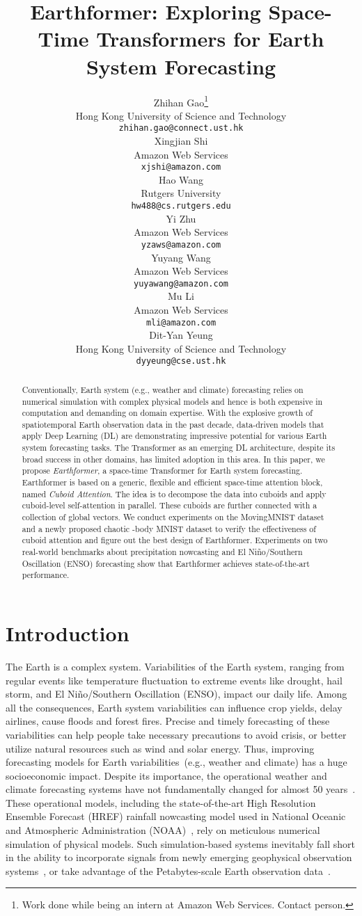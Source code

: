 \documentclass{article}
\title{Earthformer: Exploring Space-Time Transformers for Earth System Forecasting}
\author{Zhihan Gao\thanks{Work done while being an intern at Amazon Web Services. Contact person.} \\
  Hong Kong University of Science and Technology\\
\texttt{zhihan.gao@connect.ust.hk} \\
  \And
  Xingjian Shi\\
  Amazon Web Services \\
  \texttt{xjshi@amazon.com} \\
  \And
  Hao Wang \\
  Rutgers University\\
  \texttt{hw488@cs.rutgers.edu}\\
  \And
  Yi Zhu\\
  Amazon Web Services \\
  \texttt{yzaws@amazon.com} \\
  \And
  Yuyang Wang\\
  Amazon Web Services \\
  \texttt{yuyawang@amazon.com} \\
  \And
  Mu Li\\
  Amazon Web Services \\
  \texttt{mli@amazon.com} \\
  \And
  Dit-Yan Yeung\\
  Hong Kong University of Science and Technology \\
  \texttt{dyyeung@cse.ust.hk} \\
}
\def\nbody{-body MNIST}
\begin{document}
\maketitle


\begin{abstract}
Conventionally, Earth system (e.g., weather and climate) forecasting relies on numerical simulation with complex physical models and hence is both expensive in computation and demanding on domain expertise. 
With the explosive growth of spatiotemporal Earth observation data in the past decade, data-driven models that apply Deep Learning (DL) are demonstrating impressive potential for various Earth system forecasting tasks.
The Transformer as an emerging DL architecture, despite its broad success in other domains, has limited adoption in this area.
In this paper, we propose \emph{Earthformer}, a space-time Transformer for Earth system forecasting. Earthformer is based on a generic, flexible and efficient space-time attention block, named \emph{Cuboid Attention}. The idea is to decompose the data into cuboids and apply cuboid-level self-attention in parallel. These cuboids are further connected with a collection of global vectors. We conduct experiments on the MovingMNIST dataset and a newly proposed chaotic \nbody{} dataset to verify the effectiveness of cuboid attention and figure out the best design of Earthformer. Experiments on two real-world benchmarks about precipitation nowcasting and El Niño/Southern Oscillation (ENSO) forecasting show that Earthformer achieves state-of-the-art performance.
\end{abstract}

\section{Introduction}

The Earth is a complex system. Variabilities of the Earth system, ranging from regular events like temperature fluctuation to extreme events like drought, hail storm, and El Niño/Southern Oscillation (ENSO), impact our daily life. Among all the consequences, Earth system variabilities can influence crop yields, delay airlines, cause floods and forest fires. Precise and timely forecasting of these variabilities can help people take necessary precautions to avoid crisis, or better utilize natural resources such as wind and solar energy. Thus, improving forecasting models for Earth variabilities~(e.g., weather and climate) has a huge socioeconomic impact. Despite its importance, the operational weather and climate forecasting systems have not fundamentally changed for almost 50 years~\cite{reichstein2019deep}. These operational models, including the state-of-the-art High Resolution Ensemble Forecast (HREF) rainfall nowcasting model used in National Oceanic and Atmospheric Administration (NOAA)~\cite{ravuri2021skilful}, rely on meticulous numerical simulation of physical models. Such simulation-based systems inevitably fall short in the ability to incorporate signals from newly emerging geophysical observation systems~\cite{goodman2019goes}, or take advantage of the Petabytes-scale Earth observation data~\cite{veillette2020sevir}.
\end{document}
